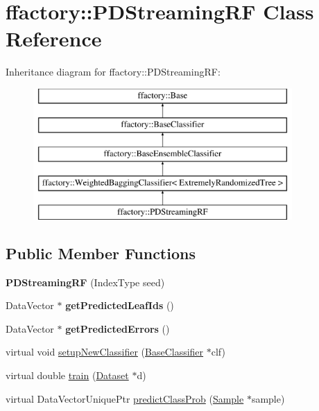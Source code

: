 \hypertarget{classffactory_1_1_p_d_streaming_r_f}{\section{ffactory\-:\-:P\-D\-Streaming\-R\-F Class Reference}
\label{classffactory_1_1_p_d_streaming_r_f}
}
Inheritance diagram for ffactory\-:\-:P\-D\-Streaming\-R\-F\-:\begin{figure}[H]
\begin{center}
\leavevmode
\includegraphics[height=5.000000cm]{classffactory_1_1_p_d_streaming_r_f}
\end{center}
\end{figure}
\subsection*{Public Member Functions}
\begin{DoxyCompactItemize}
\item 
\hypertarget{classffactory_1_1_p_d_streaming_r_f_ad0a5b8537a0a561b01157798509222e1}{{\bfseries P\-D\-Streaming\-R\-F} (Index\-Type seed)}\label{classffactory_1_1_p_d_streaming_r_f_ad0a5b8537a0a561b01157798509222e1}

\item 
\hypertarget{classffactory_1_1_p_d_streaming_r_f_ac0e9a5abfec40422f8fe1245c7e089b5}{Data\-Vector $\ast$ {\bfseries get\-Predicted\-Leaf\-Ids} ()}\label{classffactory_1_1_p_d_streaming_r_f_ac0e9a5abfec40422f8fe1245c7e089b5}

\item 
\hypertarget{classffactory_1_1_p_d_streaming_r_f_a4c0ef7f79e57b905c95a0e08f8fd3b5c}{Data\-Vector $\ast$ {\bfseries get\-Predicted\-Errors} ()}\label{classffactory_1_1_p_d_streaming_r_f_a4c0ef7f79e57b905c95a0e08f8fd3b5c}

\item 
virtual void \hyperlink{classffactory_1_1_p_d_streaming_r_f_a4e9a1bdf1dcf3951dd7ef2d1c35330ab}{setup\-New\-Classifier} (\hyperlink{classffactory_1_1_base_classifier}{Base\-Classifier} $\ast$clf)
\item 
virtual double \hyperlink{classffactory_1_1_p_d_streaming_r_f_a711860e77360cb3fa8ff2a3160657997}{train} (\hyperlink{classffactory_1_1_dataset}{Dataset} $\ast$d)
\item 
virtual Data\-Vector\-Unique\-Ptr \hyperlink{classffactory_1_1_p_d_streaming_r_f_a4a3fc1045d27d15c0a4209378ea7789b}{predict\-Class\-Prob} (\hyperlink{classffactory_1_1_sample}{Sample} $\ast$sample)
\end{DoxyCompactItemize}
